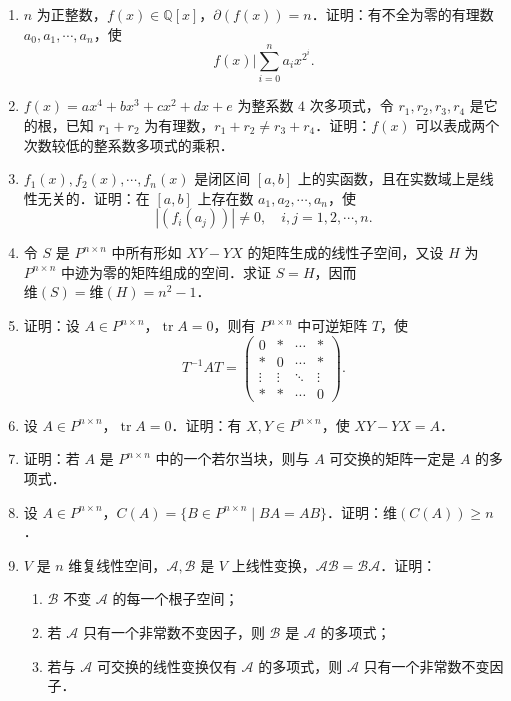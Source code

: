 \begin{enumerate}
  \item $n$ 为正整数，$f(x)\in\mathbb{Q}[x]$，$\partial(f(x))=n$．证明：有不全为零的有理数 $a_0,a_1,\cdots,a_n$，使
  \[
    f(x)\Big|\sum_{i=0}^n a_ix^{2^i}.
  \]

  \ansproof
  \item $f(x)=ax^4+bx^3+cx^2+dx+e$ 为整系数 $4$ 次多项式，令 $r_1,r_2,r_3,r_4$ 是它的根，已知 $r_1+r_2$ 为有理数，$r_1+r_2\neq r_3+r_4$．证明：$f(x)$ 可以表成两个次数较低的整系数多项式的乘积．

  \ansproof
  \item $f_1(x),f_2(x),\cdots,f_n(x)$ 是闭区间 $[a,b]$ 上的实函数，且在实数域上是线性无关的．证明：在 $[a,b]$ 上存在数 $a_1,a_2,\cdots,a_n$，使
  \[
    \left|(f_i(a_j))\right|\neq 0,\quad i,j=1,2,\cdots,n.
  \]

  \ansproof
  \item 令 $S$ 是 $P^{n\times n}$ 中所有形如 $XY-YX$ 的矩阵生成的线性子空间，又设 $H$ 为 $P^{n\times n}$ 中迹为零的矩阵组成的空间．求证 $S=H$，因而 $\text{维}(S)=\text{维}(H)=n^2-1$．

  \ansproof
  \item 证明：设 $A\in P^{n\times n}$，$\operatorname{tr}A=0$，则有 $P^{n\times n}$ 中可逆矩阵 $T$，使
  \[
    T^{-1}AT=
    \begin{pmatrix}
      0 & * & \cdots & *\\
      * & 0 & \cdots & *\\
      \vdots & \vdots & \ddots & \vdots\\
      * & * & \cdots & 0
    \end{pmatrix}.
  \]

  \ansproof
  \item 设 $A\in P^{n\times n}$，$\operatorname{tr}A=0$．证明：有 $X,Y\in P^{n\times n}$，使 $XY-YX=A$．

  \ansproof
  \item 证明：若 $A$ 是 $P^{n\times n}$ 中的一个若尔当块，则与 $A$ 可交换的矩阵一定是 $A$ 的多项式．

  \ansproof
  \item 设 $A\in P^{n\times n}$，$C(A)=\{B\in P^{n\times n}\mid BA=AB\}$．证明：$\text{维}(C(A))\geq n$．

  \ansproof
  \item $V$ 是 $n$ 维复线性空间，$\mathcal{A},\mathcal{B}$ 是 $V$ 上线性变换，$\mathcal{A}\mathcal{B}=\mathcal{B}\mathcal{A}$．证明：
  \begin{enumerate}
    \item $\mathcal{B}$ 不变 $\mathcal{A}$ 的每一个根子空间；
  \anssub
    \item 若 $\mathcal{A}$ 只有一个非常数不变因子，则 $\mathcal{B}$ 是 $\mathcal{A}$ 的多项式；
  \anssub
    \item 若与 $\mathcal{A}$ 可交换的线性变换仅有 $\mathcal{A}$ 的多项式，则 $\mathcal{A}$ 只有一个非常数不变因子．
  \anssub
  \end{enumerate}


\end{enumerate}
